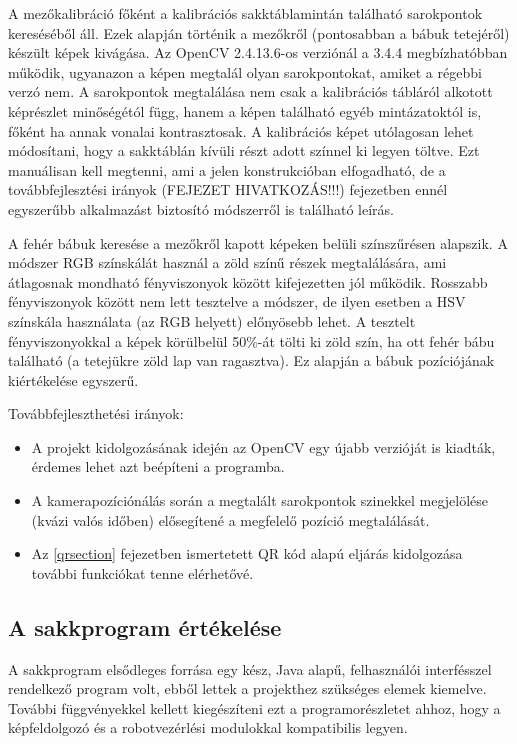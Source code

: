 \documentclass[../documentation.tex]{subfiles}
\begin{document}
A mezőkalibráció főként a kalibrációs sakktáblamintán található sarokpontok kereséséből áll. Ezek alapján történik a mezőkről (pontosabban a bábuk tetejéről) készült képek kivágása. Az OpenCV 2.4.13.6-os verziónál a 3.4.4 megbízhatóbban működik, ugyanazon a képen megtalál olyan sarokpontokat, amiket a régebbi verzó nem. A sarokpontok megtalálása nem csak a kalibrációs tábláról alkotott képrészlet minőségétól függ, hanem a képen található egyéb mintázatoktól is, főként ha annak vonalai kontrasztosak. A kalibrációs képet utólagosan lehet módosítani, hogy a sakktáblán kívüli részt adott színnel ki legyen töltve. Ezt manuálisan kell megtenni, ami a jelen konstrukcióban elfogadható, de a továbbfejlesztési irányok (FEJEZET HIVATKOZÁS!!!) fejezetben ennél egyszerűbb alkalmazást biztosító módszerről is található leírás.

A fehér bábuk keresése a mezőkről kapott képeken belüli színszűrésen alapszik. A módszer RGB színskálát használ a zöld színű részek megtalálására, ami átlagosnak mondható fényviszonyok között kifejezetten jól működik. Rosszabb fényviszonyok között nem lett tesztelve a módszer, de ilyen esetben a HSV színskála használata (az RGB helyett) előnyösebb lehet. A tesztelt fényviszonyokkal a képek körülbelül 50\%-át tölti ki zöld szín, ha ott fehér bábu található (a tetejükre zöld lap van ragasztva). Ez alapján a bábuk pozíciójának kiértékelése egyszerű.

Továbbfejleszthetési irányok:
\begin{itemize}
	\item A projekt kidolgozásának idején az OpenCV egy újabb verzióját is kiadták, érdemes lehet azt beépíteni a programba.
	\item A kamerapozíciónálás során a megtalált sarokpontok szinekkel megjelölése (kvázi valós időben) elősegítené a megfelelő pozíció megtalálását.
	\item Az \ref{qrsection} fejezetben ismertetett QR kód alapú eljárás kidolgozása további funkciókat tenne elérhetővé.
\end{itemize}

\subsection{A sakkprogram értékelése}
A sakkprogram elsődleges forrása egy kész, Java alapű, felhasználói interfésszel rendelkező program volt, ebből lettek a projekthez szükséges elemek kiemelve. További függvényekkel kellett kiegészíteni ezt a programorészletet ahhoz, hogy a képfeldolgozó és a robotvezérlési modulokkal kompatibilis legyen.
\end{document}
